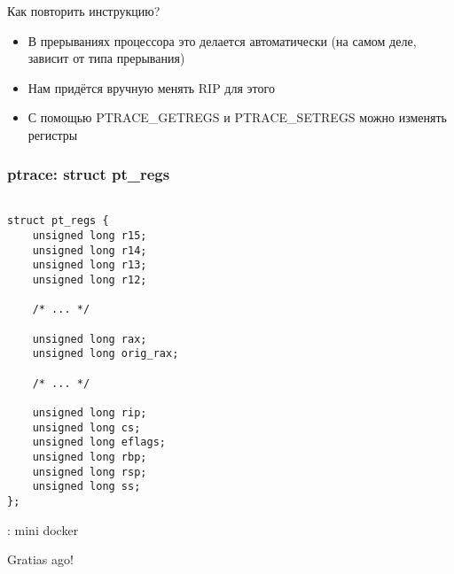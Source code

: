\documentclass[10pt,pdf,hyperref={unicode}]{beamer}
\begin{document}
\begin{frame}{Как повторить инструкцию?}
\begin{itemize}
    \item В прерываниях процессора это делается автоматически (на самом деле, зависит от типа прерывания)
    \item Нам придётся вручную менять RIP для этого
    \item С помощью PTRACE\_GETREGS и PTRACE\_SETREGS можно изменять регистры
\end{itemize}
\end{frame}


\begin{frame}[fragile]
\frametitle{ptrace: struct pt\_regs}
\begin{center}
\begin{minipage}{0.95\textwidth}
\begin{verbatim}

struct pt_regs {
    unsigned long r15;
    unsigned long r14;
    unsigned long r13;
    unsigned long r12;

    /* ... */

    unsigned long rax;
    unsigned long orig_rax;

    /* ... */

    unsigned long rip;
    unsigned long cs;
    unsigned long eflags;
    unsigned long rbp;
    unsigned long rsp;
    unsigned long ss;
};

\end{verbatim}
\end{minipage}
\end{center}
\end{frame}


\begin{frame}
\center{}: mini docker
\end{frame}



\begin{frame}
\center\Huge{Gratias ago!}
\end{frame}
\end{document}
